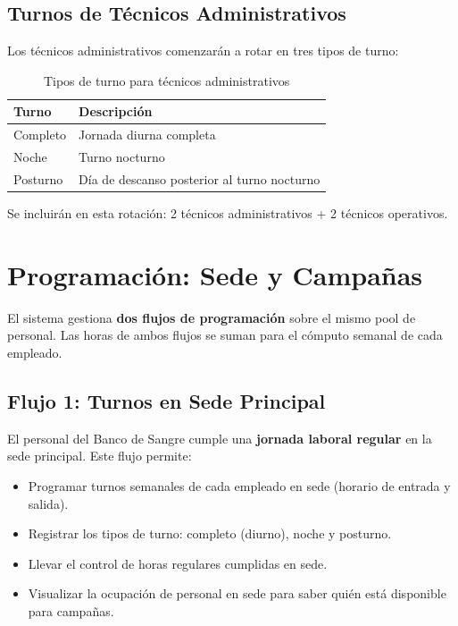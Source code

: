 \documentclass[10pt,a4paper]{article}
\begin{document}
\subsection{Turnos de T\'{e}cnicos Administrativos}

Los t\'{e}cnicos administrativos comenzar\'{a}n a rotar en tres tipos de turno:

\begin{table}[h!]
\centering
\begin{tabularx}{\textwidth}{|l|X|}
\hline
\textbf{Turno} & \textbf{Descripci\'{o}n} \\
\hline
Completo & Jornada diurna completa \\
\hline
Noche & Turno nocturno \\
\hline
Posturno & D\'{i}a de descanso posterior al turno nocturno \\
\hline
\end{tabularx}
\caption{Tipos de turno para t\'{e}cnicos administrativos}
\end{table}

Se incluir\'{a}n en esta rotaci\'{o}n: 2 t\'{e}cnicos administrativos + 2 t\'{e}cnicos operativos.

\section{Programaci\'{o}n: Sede y Campañas}

El sistema gestiona \textbf{dos flujos de programaci\'{o}n} sobre el mismo pool de personal. Las horas de ambos flujos se suman para el c\'{o}mputo semanal de cada empleado.

\subsection{Flujo 1: Turnos en Sede Principal}

El personal del Banco de Sangre cumple una \textbf{jornada laboral regular} en la sede principal. Este flujo permite:

\begin{itemize}[leftmargin=2em]
    \item Programar turnos semanales de cada empleado en sede (horario de entrada y salida).
    \item Registrar los tipos de turno: completo (diurno), noche y posturno.
    \item Llevar el control de horas regulares cumplidas en sede.
    \item Visualizar la ocupaci\'{o}n de personal en sede para saber qui\'{e}n est\'{a} disponible para campañas.
\end{itemize}
\end{document}
